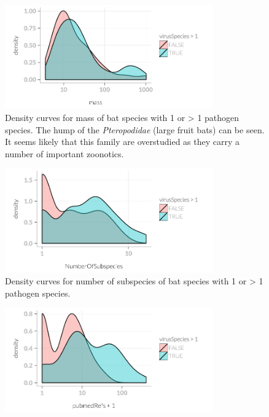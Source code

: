 \begin{knitrout}\footnotesize
{}\color{fgcolor}\begin{figure}[t]

{\centering \includegraphics[width=0.8\textwidth]{figure/rm1vir-1} 

}

\caption[Density of mass variable for 1 or >1 viruses.]{
Density curves for mass of bat species with 1 or > 1 pathogen species.
The hump of the \emph{Pteropodidae} (large fruit bats) can be seen.
It seems likely that this family are overstudied as they carry a number of important zoonotics.}\label{fig:rm1vir}
\end{figure}

\begin{figure}[t]

{\centering \includegraphics[width=0.8\textwidth]{figure/rm1vir-2} 

}

\caption[Density of number of subspecies 1 or >1 viruses.]{Density curves for number of subspecies of bat species with 1 or > 1 pathogen species.}\label{fig:rm1vir}
\end{figure}

\begin{figure}[t]

{\centering \includegraphics[width=0.8\textwidth]{figure/rm1vir-3} 

}
\end{figure}
\end{knitrout}

